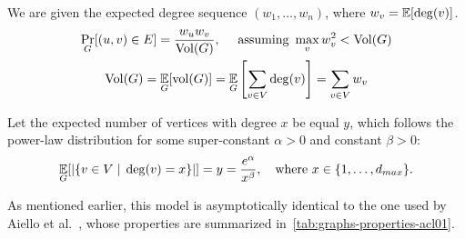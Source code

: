 We are given the expected degree sequence $(w_1,\ldots,w_n)$, where $w_v=\mathop{{}\mathbb{E}}[\deg(v)]$.
\begin{gather}
    \label{eq:powerlaw-coin-toss-edge-pr}
    \Pr_G[(u,v)\in E]=\frac{w_u w_v}{\operatorname*{Vol}(G)},
    \quad\text{ assuming }\max_v w_v^2<\operatorname*{Vol}(G)\\
    \operatorname*{Vol}(G)=\mathop{{}\mathbb{E}}_G[\operatorname*{vol}(G)]=\mathop{{}\mathbb{E}}_G\left[\sum_{v\in V} \deg(v)\right]=\sum_{v\in V} w_v
\end{gather}


Let the expected number of vertices with degree $x$ be equal $y$,
which follows the power-law distribution for some super-constant $\alpha>0$ and constant $\beta>0$:
\begin{equation}
    \mathop{{}\mathbb{E}}_G[|\{v \in V\;|\;\deg(v)=x\}|]=y=\frac{e^\alpha}{x^\beta},
    \quad\text{where }x\in\{1,\ldots,d_{max}\}.
\end{equation}

As mentioned earlier, this model is asymptotically identical to the one
used by Aiello et al.~\cite{acl01}, whose properties are summarized in~\autoref{tab:graphs-properties-acl01}.

